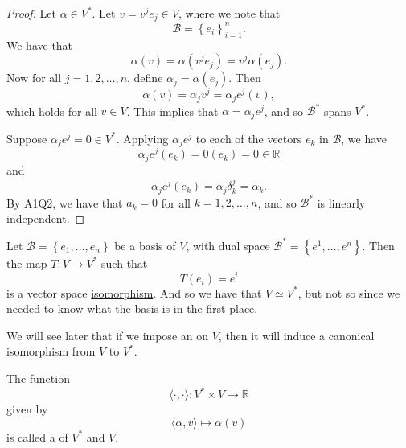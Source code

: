 \documentclass[notoc,notitlepage]{tufte-book}
\begin{document}
\begin{proof}
  Let $\alpha \in V^*$. Let $v = v^j e_j \in V$,
  where we note that
  \begin{equation*}
    \mathcal{B} = \left\{ e_i \right\}_{i = 1}^{n}.
  \end{equation*}
  We have that
  \begin{equation*}
    \alpha(v) = \alpha(v^j e_j) = v^j \alpha( e_j ).
  \end{equation*}
  Now for all $j = 1, 2, \ldots, n$, define $\alpha_j = \alpha(e_j)$.
  Then
  \begin{equation*}
    \alpha(v) = \alpha_j v^j = \alpha_j e^j(v),
  \end{equation*}
  which holds for all $v \in V$. This implies that $\alpha = \alpha_j e^j$,
  and so $\mathcal{B}^*$ spans $V^*$.

  \noindent
  Suppose $\alpha_j e^j = 0 \in V^*$.
  Applying $\alpha_j e^j$ to each of the vectors $e_k$ in $\mathcal{B}$, we have
  \begin{equation*}
    \alpha_j e^j(e_k) = 0(e_k) = 0 \in \mathbb{R}
  \end{equation*}
  and
  \begin{equation*}
    \alpha_j e^j(e_k) = \alpha_j \delta_k^j = \alpha_k.
  \end{equation*}
  By A1Q2, we have that $a_k = 0$ for all $k = 1, 2, \ldots, n$,
  and so $\mathcal{B}^*$ is linearly independent.
\end{proof}

\begin{remark}
  Let $\mathcal{B} = \left\{ e_1, \ldots, e_n \right\}$ be a basis of $V$,
  with dual space $\mathcal{B}^* = \left\{ e^1, \ldots, e^n \right\}$.
  Then the map $T : V \to V^*$ such that
  \begin{equation*}
    T(e_i) = e^i
  \end{equation*}
  is a vector space \hyperref[defn:linear_isomorphism]{isomorphism}.
  And so we have that $V \simeq V^*$, but not  so
  since we needed to know what the basis is in the first place.
\end{remark}

We will see later that if we impose an  on $V$,
then it will induce a canonical isomorphism from $V$ to $V^*$.

\begin{defn}\label{defn:natural_pairing}
  The function
  \begin{equation*}
    \langle \cdot, \cdot \rangle : V^* \times V \to \mathbb{R}
  \end{equation*}
  given by
  \begin{equation*}
    \langle \alpha, v \rangle \mapsto \alpha (v)
  \end{equation*}
  is called a  of $V^*$ and $V$.
\end{defn}
\end{document}
